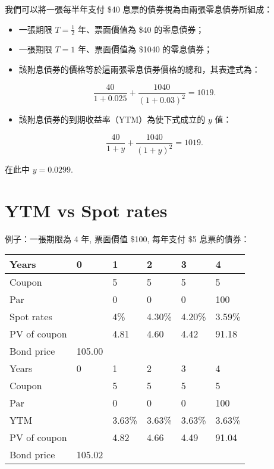 \documentclass[letterpaper]{article}
\begin{document}
我們可以將一張每半年支付 \$40 息票的債券視為由兩張零息債券所組成：

\begin{itemize}
	\item 一張期限 \(T = \tfrac{1}{2}\) 年、票面價值為 \$40 的零息債券；
	\item 一張期限 \(T = 1\) 年、票面價值為 \$1040 的零息債券；
	\item 該附息債券的價格等於這兩張零息債券價格的總和，其表達式為：
\end{itemize}


$$
\frac{40}{1+0.025}+\frac{1040}{(1+0.03)^{2}}=1019 .
$$

\begin{itemize}
	\item 該附息債券的到期收益率（YTM）為使下式成立的 \( y \) 值：
\end{itemize}


$$
\frac{40}{1+y}+\frac{1040}{(1+y)^{2}}=1019 .
$$

在此中 $y=0.0299$.

\section*{YTM vs Spot rates}
例子：一張期限為 4 年, 票面價值 \$100, 每年支付 \$5 息票的債券：


\begin{center}
\begin{tabular}{|l|l|l|l|l|l|}
\hline
Years & 0 & 1 & 2 & 3 & 4 \\
\hline
Coupon &  & 5 & 5 & 5 & 5 \\
\hline
Par &  & 0 & 0 & 0 & 100 \\
\hline
Spot rates &  & 4\% & 4.30\% & 4.20\% & 3.59\% \\
\hline
PV of coupon &  & 4.81 & 4.60 & 4.42 & 91.18 \\
\hline
Bond price & 105.00 &  &  &  &  \\
\hline
Years & 0 & 1 & 2 & 3 & 4 \\
\hline
Coupon &  & 5 & 5 & 5 & 5 \\
\hline
Par &  & 0 & 0 & 0 & 100 \\
\hline
YTM &  & 3.63\% & 3.63\% & 3.63\% & 3.63\% \\
\hline
PV of coupon &  & 4.82 & 4.66 & 4.49 & 91.04 \\
\hline
Bond price & 105.02 &  &  &  &  \\
\hline
\end{tabular}
\end{center}
\end{document}
